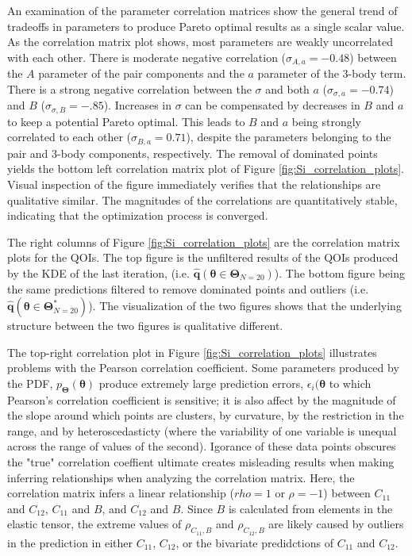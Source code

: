 An examination of the parameter correlation matrices show the general trend of tradeoffs in parameters to produce Pareto optimal results as a single scalar value.  As the correlation matrix plot shows, most parameters are weakly uncorrelated with each other.
There is moderate negative correlation ($\sigma_{A,a}=-0.48$) between the $A$ parameter of the pair components and the $a$ parameter of the 3-body term.
There is a strong negative correlation between the $\sigma$ and both $a$ ($\sigma_{\sigma,a}=-0.74$) and $B$ ($\sigma_{\sigma,B}=-.85$).  Increases in $\sigma$ can be compensated by decreases in $B$ and $a$ to keep a potential Pareto optimal.
This leads to $B$ and $a$ being strongly correlated to each other ($\sigma_{B,a}=0.71$), despite the parameters belonging to the pair and 3-body components, respectively.
The removal of dominated points yields the bottom left correlation matrix plot of Figure \ref{fig:Si_correlation_plots}.
Visual inspection of the figure immediately verifies that the relationships are qualitative similar.
The magnitudes of the correlations are quantitatively stable, indicating that the optimization process is converged.

The right columns of Figure \ref{fig:Si_correlation_plots} are the correlation matrix plots for the QOIs.
The top figure is the unfiltered results of the QOIs produced by the KDE of the last iteration, (i.e. $\hat{\bm{q}}(\bm{\theta} \in \bm{\Theta}_{N=20})$).
The bottom figure being the same predictions filtered to remove dominated points and outliers (i.e. $\hat{\bm{q}}(\bm{\theta} \in \bm{\Theta}_{N=20}^*)$).
The visualization of the two figures shows that the underlying structure between the two figures is qualitative different.

The top-right correlation plot in Figure \ref{fig:Si_correlation_plots} illustrates problems with the Pearson correlation coefficient.
Some parameters produced by the PDF, $p_{\bm{\Theta}}(\bm{\theta})$ produce extremely large prediction errors, $\epsilon_i(\bm{\theta}$ to which Pearson’s correlation coefficient is sensitive; it is also affect by the magnitude of the slope around which points are clusters, by curvature, by the restriction in the range, and by heteroscedasticty (where the variability of one variable is unequal across the range of values of the second).\cite{wilcox2011_estimation_1,wilcox2011_estimation_2}
Igorance of these data points obscures the "true" correlation coeffient ultimate creates misleading results when making inferring relationships when analyzing the correlation matrix.  Here, the correlation matrix infers a linear relationship ($rho=1$ or $\rho=-1$) between $C_{11}$ and $C_{12}$, $C_{11}$ and $B$, and $C_{12}$ and $B$.
Since $B$ is calculated from elements in the elastic tensor, the extreme values of $\rho_{C_{11},B}$ and $\rho_{C_{12},B}$ are likely caused by outliers in the prediction in either $C_{11}$, $C_{12}$, or the bivariate predidctions of $C_{11}$ and $C_{12}$.

